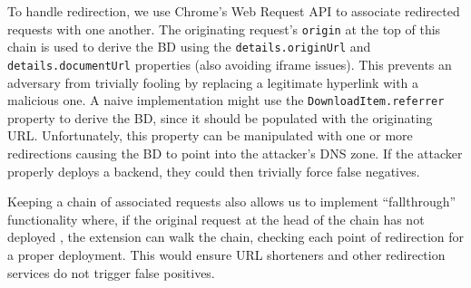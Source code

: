To handle redirection, we use Chrome's Web Request API to associate redirected
requests with one another. The originating request's \texttt{origin} at the top
of this chain is used to derive the BD using the \texttt{details.originUrl} and
\texttt{details.documentUrl} properties (also avoiding iframe issues). This
prevents an adversary from trivially fooling \SYSTEM{} by replacing a legitimate
hyperlink with a malicious one. A naive implementation might use the
\texttt{DownloadItem.referrer} property to derive the BD, since it should be
populated with the originating URL. Unfortunately, this property can be
manipulated with one or more redirections causing the BD to point into the
attacker's DNS zone. If the attacker properly deploys a \SYSTEM{} backend, they
could then trivially force false negatives.

Keeping a chain of associated requests also allows us to implement
``fallthrough'' functionality where, if the original request at the head of the
chain has not deployed \SYSTEM{}, the extension can walk the chain, checking
each point of redirection for a proper \SYSTEM{} deployment. This would ensure
URL shorteners and other redirection services do not trigger false positives.
